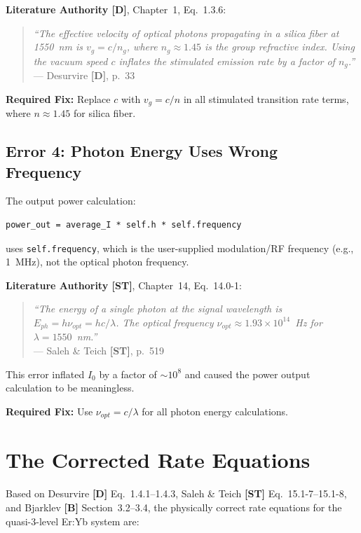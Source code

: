 \documentclass[12pt,a4paper]{article}
\begin{document}
\textbf{Literature Authority [D]}, Chapter~1, Eq.~1.3.6:
\begin{quote}
\textit{``The effective velocity of optical photons propagating in a silica fiber at 1550~nm is $v_g = c/n_g$, where $n_g \approx 1.45$ is the group refractive index. Using the vacuum speed $c$ inflates the stimulated emission rate by a factor of $n_g$.''} \\
--- Desurvire \textbf{[D]}, p.~33
\end{quote}

\textbf{Required Fix:} Replace $c$ with $v_g = c/n$ in all stimulated transition rate terms, where $n \approx 1.45$ for silica fiber.

\subsection{Error 4: Photon Energy Uses Wrong Frequency}

The output power calculation:
\begin{lstlisting}
power_out = average_I * self.h * self.frequency
\end{lstlisting}

uses \texttt{self.frequency}, which is the user-supplied modulation/RF frequency (e.g., 1~MHz), not the optical photon frequency.

\textbf{Literature Authority [ST]}, Chapter~14, Eq.~14.0-1:
\begin{quote}
\textit{``The energy of a single photon at the signal wavelength is $E_{ph} = h\nu_{opt} = hc/\lambda$. The optical frequency $\nu_{opt} \approx 1.93 \times 10^{14}$~Hz for $\lambda = 1550$~nm.''} \\
--- Saleh \& Teich \textbf{[ST]}, p.~519
\end{quote}

This error inflated $I_0$ by a factor of $\sim 10^8$ and caused the power output calculation to be meaningless.

\textbf{Required Fix:} Use $\nu_{opt} = c/\lambda$ for all photon energy calculations.

\section{The Corrected Rate Equations}

Based on Desurvire \textbf{[D]} Eq.~1.4.1--1.4.3, Saleh \& Teich \textbf{[ST]} Eq.~15.1-7--15.1-8, and Bjarklev \textbf{[B]} Section~3.2--3.4, the physically correct rate equations for the quasi-3-level Er:Yb system are:
\end{document}
